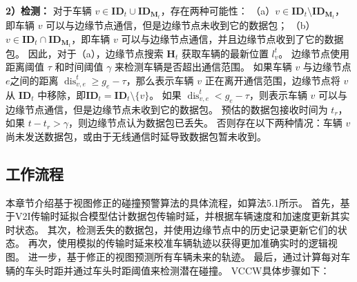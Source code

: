\textbf{2）检测：}
对于车辆 ${v} \in \mathbf{ID}_{t} \cup \mathbf{ID}_{\mathbf{M}_{t}}$，存在两种可能性：
（a）${v} \in \mathbf{ID}_{t} \setminus \mathbf{ID}_{\mathbf{M}_{t}}$，即车辆 $v$ 可以与边缘节点通信，但是边缘节点未收到它的数据包；
（b）${v} \in \mathbf{ID}_{t} \cap \mathbf{ID}_{\mathbf{M}_{t}}$，即车辆 $v$ 可以与边缘节点通信，并且边缘节点收到了它的数据包。
因此，对于（a），边缘节点搜索 ${\mathbf{H}_{t}}$ 获取车辆的最新位置 $l_v^t$。
边缘节点使用距离阈值 $\tau$ 和时间阈值 $\gamma$ 来检测车辆是否超出通信范围。
如果车辆 $v$ 与边缘节点$e$之间的距离 $\operatorname{dis}_{v, e}^{t} \geq g_e - \tau$，那么表示车辆 $v$ 正在离开通信范围，边缘节点将 $v$ 从 $\mathbf{ID}_{t}$ 中移除，即$\mathbf{ID}_{t}=\mathbf{ID}_{t} \setminus \{v\}$。
如果 $\operatorname{dis}_{v, e}^{t} < g_e - \tau$，则表示车辆 $v$ 可以与边缘节点通信，但是边缘节点未收到它的数据包。
预估的数据包接收时间为 $t_r$，如果 $t - t_r > \gamma$，则边缘节点认为数据包已丢失。
否则存在以下两种情况：车辆 $v$ 尚未发送数据包，或由于无线通信时延导致数据包暂未收到。

\subsection{工作流程}

本章节介绍基于视图修正的碰撞预警算法的具体流程，如算法5.1所示。
首先，基于V2I传输时延拟合模型估计数据包传输时延，并根据车辆速度和加速度更新其实时状态。
其次，检测丢失的数据包，并使用边缘节点中的历史记录更新它们的状态。
再次，使用模拟的传输时延来校准车辆轨迹以获得更加准确实时的逻辑视图。
进一步，基于修正的视图预测所有车辆未来的轨迹。
最后，通过计算每对车辆的车头时距并通过车头时距阈值来检测潜在碰撞。
VCCW具体步骤如下：


